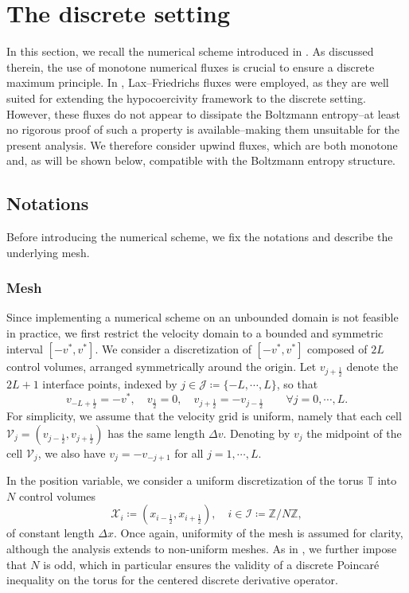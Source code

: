 \documentclass[reqno]{amsart}
\newcommand{\Dx}{\Delta x}
\newcommand{\Dv}{\Delta v}
\newcommand{\T}{\mathbb{T}}
\newcommand{\II}{\mathcal{I}}
\newcommand{\J}{\mathcal{J}}
\newcommand{\iph}{{i+\frac{1}{2}}}
\newcommand{\imh}{{i-\frac{1}{2}}}
\newcommand{\jph}{{j+\frac{1}{2}}}
\newcommand{\jmh}{{j-\frac{1}{2}}}
\numberwithin{equation}{section}
\begin{document}
\section{The discrete setting}\label{sec:DiscreteSetting}
In this section, we recall the numerical scheme introduced in \cite{BCLR2025}. As discussed therein, the use of monotone numerical fluxes is crucial to ensure a discrete maximum principle. In \cite{BCLR2025}, Lax–Friedrichs fluxes were employed, as they are well suited for extending the hypocoercivity framework to the discrete setting. However, these fluxes do not appear to dissipate the Boltzmann entropy--at least no rigorous proof of such a property is available--making them unsuitable for the present analysis. We therefore consider upwind fluxes, which are both monotone and, as will be shown below, compatible with the Boltzmann entropy structure.

\subsection{Notations}
Before introducing the numerical scheme, we fix the notations and describe the underlying mesh.
\subsubsection{Mesh}
Since implementing a numerical scheme on an unbounded domain is not feasible in practice, we first restrict the velocity domain to a bounded and symmetric interval $[-v^*,v^*]$. We consider a discretization of $[-v^*,v^*]$ composed of $2L$ control volumes, arranged symmetrically around the origin. Let $v_\jph$ denote the $2L+1$ interface points, indexed by $j\in\J\coloneq\{-L,\cdots,L\}$, so that
\[ v_{-L+\frac{1}{2}}=-v^*,\quad v_{\frac{1}{2}}=0,\quad v_\jph=-v_\jmh \qquad \forall j=0,\cdots,L.\]
For simplicity, we assume that the velocity grid is uniform, namely that each cell $\mathcal{V}_j=(v_\jmh,v_\jph)$ has the same length $\Dv$. Denoting by $v_j$ the midpoint of the cell $\mathcal{V}_j$, we also have $v_j=-v_{-j+1}$ for all $j=1,\cdots,L$.

In the position variable, we consider a uniform discretization of the torus $\T$ into $N$ control volumes
\[\mathcal{X}_i\coloneq(x_\imh,x_\iph), \quad i\in\II\coloneq\mathbb{Z}/N\mathbb{Z},\]
of constant length $\Dx$. Once again, uniformity of the mesh is assumed for clarity, although the analysis extends to non-uniform meshes. As in \cite{BessemoulinHerdaRey2020}, we further impose that $N$ is odd, which in particular ensures the validity of a discrete Poincaré inequality on the torus for the centered discrete derivative operator.
\end{document}
